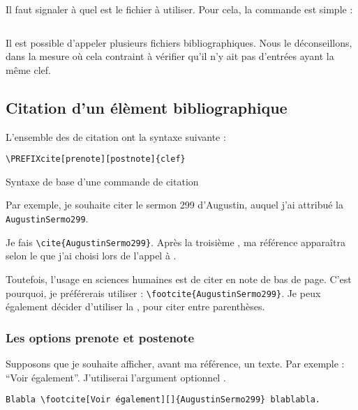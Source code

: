 Il faut signaler à  quel est le fichier  à utiliser. Pour cela, la commande est simple :

\begin{verbatim}

\end{verbatim}

\begin{attention}
Il est possible d'appeler plusieurs fichiers bibliographiques. Nous le déconseillons, dans la mesure où cela contraint à vérifier qu'il n'y ait pas d'entrées ayant la même clef.
\end{attention}

\subsection{Citation d'un élèment bibliographique}

L'ensemble des  de citation ont la syntaxe suivante : 

\begin{listing}[ht]
\begin{verbatim}
\PREFIXcite[prenote][postnote]{clef}
\end{verbatim}
\caption{Syntaxe de base d'une commande de citation}
\end{listing}

Par exemple, je souhaite citer le sermon 299 d'Augustin, auquel j'ai attribué la  \verb|AugustinSermo299|.

Je fais \verb|\cite{AugustinSermo299}|. Après la troisième , ma référence apparaîtra selon le  que j'ai choisi lors de l'appel à  .

Toutefois, l'usage en sciences humaines est de citer en note de bas de page. C'est pourquoi, je préférerais utiliser : \verb|\footcite{AugustinSermo299}|. Je peux également décider d'utiliser la  , pour citer entre parenthèses.

\subsubsection{Les options prenote et postenote}

Supposons que je souhaite afficher, avant ma référence, un texte. Par exemple : \enquote{Voir également}. J'utiliserai l'argument optionnel .

\begin{verbatim}
Blabla \footcite[Voir également][]{AugustinSermo299} blablabla.
\end{verbatim}

